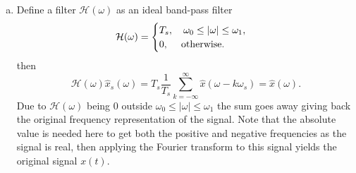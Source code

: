 \begin{enumerate}
\begin{enumerate}[a)]
\item Define a filter $\mathcal{H}(\omega)$ as an ideal band-pass filter
$$\mathcal{H}(\omega)=\begin{cases}
    T_{s}, \quad \omega_{0}\le|\omega|\le\omega_{1}, \\
    0, \quad \hspace{0.1cm}\text{otherwise}.
\end{cases}$$
then 
$$\mathcal{H}(\omega)\hat{x}_{s}(\omega)=T_{s}\frac{1}{T_{s}}\sum_{k=-\infty}^{\infty}\hat{x}(\omega-k\omega_{s})=\hat{x}(\omega).$$
Due to $\mathcal{H}(\omega)$ being $0$ outside $\omega_{0}\le|\omega|\le\omega_{1}$ the sum goes away giving back the original frequency representation of the signal. Note that the absolute value is needed here to get both the positive and negative frequencies as the signal is real, then applying the Fourier transform to this signal yields the original signal $x(t)$. 
\end{enumerate}

















\end{enumerate}
